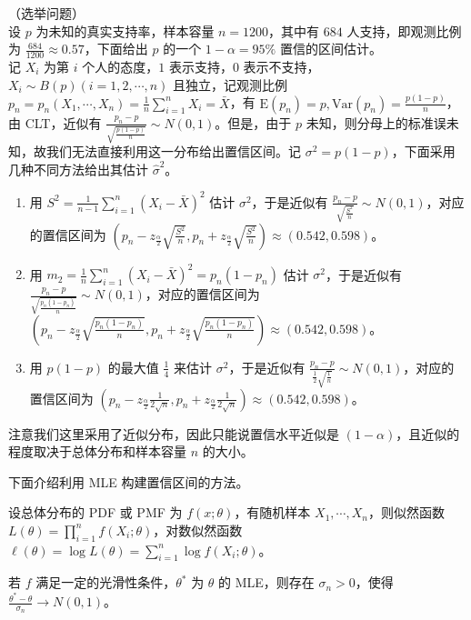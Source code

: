 \documentclass[../main.tex]{subfiles}
\begin{document}
\begin{example}
    （选举问题）\\
    设 $p$ 为未知的真实支持率，样本容量 $n=1200$，其中有 $684$ 人支持，即观测比例为 $\frac{684}{1200}\approx0.57$，下面给出 $p$ 的一个 $1-\alpha=95\%$ 置信的区间估计。\\
    记 $X_i$ 为第 $i$ 个人的态度，$1$ 表示支持，$0$ 表示不支持，$X_i\sim B(p)(i=1,2,\cdots,n)$ 且独立，记观测比例 $p_n=p_n(X_1,\cdots,X_n)=\frac1n\sum_{i=1}^nX_i=\bar X$，有 $\mathrm E(p_n)=p,\mathrm{Var}(p_n)=\frac{p(1-p)}n$，由 CLT，近似有 $\frac{p_n-p}{\sqrt{\frac{p(1-p)}n}}\sim N(0,1)$。但是，由于 $p$ 未知，则分母上的标准误未知，故我们无法直接利用这一分布给出置信区间。记 $\sigma^2=p(1-p)$，下面采用几种不同方法给出其估计 $\hat\sigma^2$。
    \begin{enumerate}
        \item 用 $S^2=\frac1{n-1}\sum_{i=1}^n(X_i-\bar X)^2$ 估计 $\sigma^2$，于是近似有 $\frac{p_n-p}{\sqrt{\frac{S^2}n}}\sim N(0,1)$，对应的置信区间为 $(p_n-z_{\frac\alpha2}\sqrt{\frac{S^2}n},p_n+z_{\frac\alpha2}\sqrt{\frac{S^2}n})\approx(0.542,0.598)$。
        \item 用 $m_2=\frac1n\sum_{i=1}^n(X_i-\bar X)^2=p_n(1-p_n)$ 估计 $\sigma^2$，于是近似有 $\frac{p_n-p}{\sqrt{\frac{p_n(1-p_n)}n}}\sim N(0,1)$，对应的置信区间为 $(p_n-z_{\frac\alpha2}\sqrt{\frac{p_n(1-p_n)}n},p_n+z_{\frac\alpha2}\sqrt{\frac{p_n(1-p_n)}n})\approx(0.542,0.598)$。
        \item 用 $p(1-p)$ 的最大值 $\frac14$ 来估计 $\sigma^2$，于是近似有 $\frac{p_n-p}{\frac12\sqrt{\frac1n}}\sim N(0,1)$，对应的置信区间为 $(p_n-z_{\frac\alpha2}\frac1{2\sqrt{n}},p_n+z_{\frac\alpha2}\frac1{2\sqrt{n}})\approx(0.542,0.598)$。
    \end{enumerate}
\end{example}

注意我们这里采用了近似分布，因此只能说置信水平近似是 $(1-\alpha)$，且近似的程度取决于总体分布和样本容量 $n$ 的大小。

下面介绍利用 MLE 构建置信区间的方法。

设总体分布的 PDF 或 PMF 为 $f(x;\theta)$，有随机样本 $X_1,\cdots,X_n$，则似然函数 $L(\theta)=\prod_{i=1}^nf(X_i;\theta)$，对数似然函数 $\ell(\theta)=\log L(\theta)=\sum_{i=1}^n\log f(X_i;\theta)$。

\begin{theorem}\label{thm:6.4.1}
    若 $f$ 满足一定的光滑性条件，$\theta^*$ 为 $\theta$ 的 MLE，则存在 $\sigma_n>0$，使得 $\frac{\theta^*-\theta}{\sigma_n}\rightarrow N(0,1)$。
\end{theorem}
\end{document}
